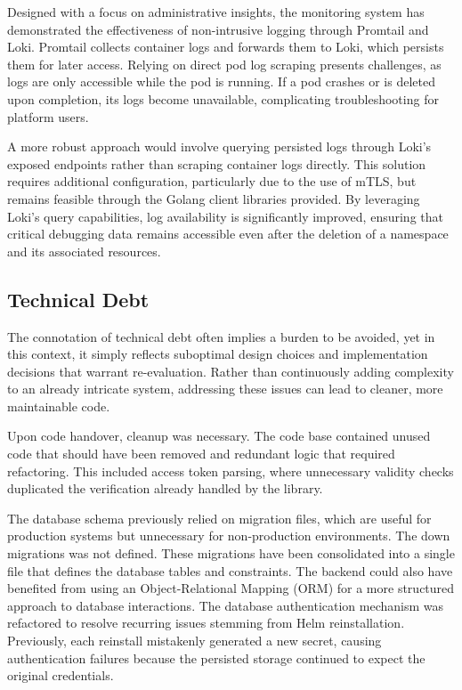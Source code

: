 Designed with a focus on administrative insights, the monitoring system has demonstrated the effectiveness of non-intrusive logging through Promtail and Loki. Promtail collects container logs and forwards them to Loki, which persists them for later access. Relying on direct pod log scraping presents challenges, as logs are only accessible while the pod is running. If a pod crashes or is deleted upon completion, its logs become unavailable, complicating troubleshooting for platform users.

A more robust approach would involve querying persisted logs through Loki's exposed endpoints rather than scraping container logs directly. This solution requires additional configuration, particularly due to the use of mTLS, but remains feasible through the Golang client libraries provided. By leveraging Loki's query capabilities, log availability is significantly improved, ensuring that critical debugging data remains accessible even after the deletion of a namespace and its associated resources.

\subsection{Technical Debt}
The connotation of technical debt often implies a burden to be avoided, yet in this context, it simply reflects suboptimal design choices and implementation decisions that warrant re-evaluation. Rather than continuously adding complexity to an already intricate system, addressing these issues can lead to cleaner, more maintainable code.

Upon code handover, cleanup was necessary. The code base contained unused code that should have been removed and redundant logic that required refactoring. This included access token parsing, where unnecessary validity checks duplicated the verification already handled by the library.

The database schema previously relied on migration files, which are useful for production systems but unnecessary for non-production environments. The down migrations was not defined. These migrations have been consolidated into a single file that defines the database tables and constraints. The backend could also have benefited from using an Object-Relational Mapping (ORM) for a more structured approach to database interactions. The database authentication mechanism was refactored to resolve recurring issues stemming from Helm reinstallation. Previously, each reinstall mistakenly generated a new secret, causing authentication failures because the persisted storage continued to expect the original credentials.

